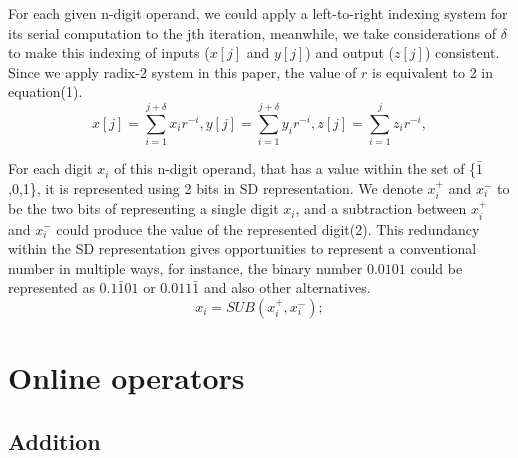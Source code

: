 \documentclass{sig-alternate}
\begin{document}
	For each given n-digit operand, we could apply a left-to-right indexing system for its serial computation to the jth iteration, meanwhile, we take considerations of $\delta$ to make this indexing of inputs ($x[j]$ and $y[j]$) and output ($z[j]$) consistent. Since we apply radix-2 system in this paper,  the value of $r$ is equivalent to 2 in equation(1)\cite{digital_arithmetic_book}.
	\begin{equation}
	 x[j]=\sum_{i=1}^{j+\delta}x_{i}r^{-i},y[j]=\sum_{i=1}^{j+\delta}y_{i}r^{-i},z[j]=\sum_{i=1}^{j}z_{i}r^{-i},
	\end{equation}
	
	For each digit $x_{i}$ of this n-digit operand, that has a value within the set of  \{$\bar{1}$,0,1\},  it is represented using 2  bits in SD representation. We denote $x_i^+$ and $x_i^-$ to be the two bits of representing a single digit $x_{i}$, and a subtraction between $x_i^+$ and $x_i^-$ could produce the value of the represented digit(2). This redundancy within the SD representation gives opportunities to represent a conventional number in multiple ways, for instance, the binary number $0.0101$ could be represented as $0.1\bar{1}01$ or $0.011\bar{1}$ and also other alternatives. 
	\begin{equation}
		x_{i}= SUB (x_i^+,x_i^-);
	\end{equation}
	
	\section{Online operators}
	
	\subsection{Addition}
	
\end{document}
